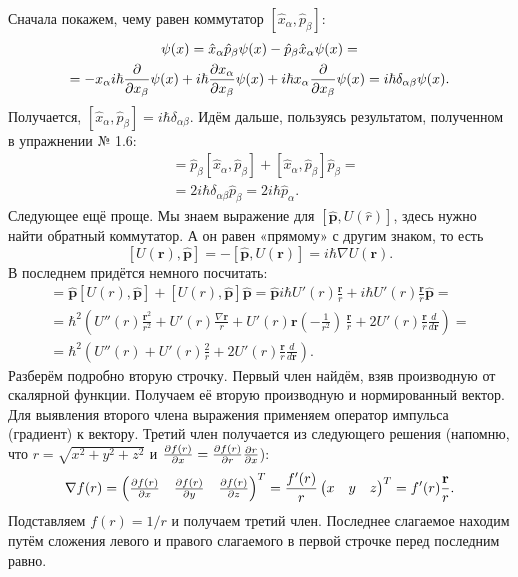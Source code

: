 Сначала покажем, чему равен коммутатор $[\hat{x}_{\alpha}, \hat{p}_{\beta}]$:
\begin{gather*}
  [\hat{x}_{\alpha}, \hat{p}_{\beta}] \psi(x) = \hat{x}_{\alpha} \hat{p}_{\beta} \psi(x) -
  \hat{p}_{\beta} \hat{x}_{\alpha} \psi(x) = \\
  = -x_{\alpha} i \hbar \pd{}{x_{\beta}} \psi(x) +
  i \hbar \pd{x_{\alpha}}{x_{\beta}} \psi(x) + i \hbar x_{\alpha} \pd{}{x_{\beta}} \psi(x) =
  i \hbar \delta_{\alpha \beta}\psi(x).
\end{gather*}
Получается, $[\hat{x}_{\alpha}, \hat{p}_{\beta}] = i \hbar \delta_{\alpha
    \beta}$. Идём дальше, пользуясь результатом, полученном в упражнении № 1.6:
\begin{align*}
  [\hat x_{\alpha}, \hat{\mathbf{p}}^2] &= \hat{p}_{\beta}
  [\hat{x}_{\alpha}, \hat{p}_{\beta}] + [\hat{x}_{\alpha}, \hat{p}_{\beta}] \hat{p}_{\beta} =\\
  &= 2 i \hbar \delta_{\alpha \beta} \hat{p}_{\beta} = 2 i \hbar \hat{p}_{\alpha}.
\end{align*}
Следующее ещё проще. Мы знаем выражение для $[\hat{\mathbf{p}}, U(\hat r)]$,
здесь нужно найти обратный коммутатор. А он равен «прямому» с другим знаком, то
есть
\[
  [U(\mathbf{r}), \hat{\mathbf{p}}] = - [\hat{\mathbf{p}}, U(\mathbf{r})] = i \hbar \nabla U(\mathbf{r}).
\]
В последнем придётся немного посчитать:
\begin{gather*}
  [U(r), \hat{\mathbf{p}}^2] = \hat{\mathbf{p}}[U(r), \hat{\mathbf{p}}] + [U(r), \hat{\mathbf{p}}]\hat{\mathbf{p}} = \hat{\mathbf{p}}i\hbar U'(r)\frac{\mathbf{r}}{r} + i\hbar U'(r)\frac{\mathbf{r}}{r}\hat{\mathbf{p}} = \\
  = \hbar^2(U''(r)\frac{\mathbf{r}^2}{r^2} + U'(r) \frac{\nabla\mathbf{r}}{r} + U'(r)\mathbf{r}(-\frac{1}{r^2})\,\frac{\mathbf{r}}{r} + 2U'(r) \frac{\mathbf{r}}{r}\frac{d}{d\mathbf{r}}) = \\
  =\hbar^2(U''(r) + U'(r) \frac{2}{r} + 2U'(r) \frac{\mathbf{r}}{r}\frac{d}{d\mathbf{r}}).
\end{gather*}
Разберём подробно вторую строчку. Первый член найдём, взяв производную от
скалярной функции. Получаем её вторую производную и нормированный вектор. Для
выявления второго члена выражения применяем оператор импульса (градиент) к
вектору. Третий член получается из следующего решения (напомню, что $r =
  \sqrt{x^2 + y^2 + z^2}$ и $\frac{\partial f(r)}{\partial x} = \frac{\partial f(r)}{\partial r} \frac{\partial r}{\partial x}$):
\[
  \nabla f(r) = \begin{pmatrix}\frac{\partial f(r)}{\partial x} & \frac{\partial f(r)}{\partial y} & \frac{\partial f(r)}{\partial z}\end{pmatrix}^T =  \frac{f'(r)}{r}\begin{pmatrix}x & y & z\end{pmatrix}^T = f'(r) \frac{\mathbf{r}}{r}.
\]
Подставляем $f(r) = 1/r$ и получаем третий член. Последнее слагаемое находим
путём сложения левого и правого слагаемого в первой строчке перед последним
равно.
\qedsq

